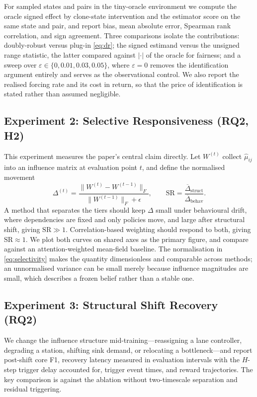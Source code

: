 \documentclass[conference]{IEEEtran}
\begin{document}
For sampled states and pairs in the tiny-oracle environment we compute the oracle signed effect by clone-state intervention and the estimator score on the same state and pair, and report bias, mean absolute error, Spearman rank correlation, and sign agreement. Three comparisons isolate the contributions: doubly-robust versus plug-in \eqref{eq:dr}; the signed estimand versus the unsigned range statistic, the latter compared against $|{\cdot}|$ of the oracle for fairness; and a sweep over $\varepsilon\in\{0,0.01,0.03,0.05\}$, where $\varepsilon=0$ removes the identification argument entirely and serves as the observational control. We also report the realised forcing rate and its cost in return, so that the price of identification is stated rather than assumed negligible.

\subsection{Experiment 2: Selective Responsiveness (RQ2, H2)}

This experiment measures the paper's central claim directly. Let $W^{(t)}$ collect $\hat\mu_{ij}$ into an influence matrix at evaluation point $t$, and define the normalised movement
\begin{equation}
\Delta^{(t)}=\frac{\big\|W^{(t)}-W^{(t-1)}\big\|_{F}}{\big\|W^{(t-1)}\big\|_{F}+\epsilon},
\qquad
\mathrm{SR}=\frac{\overline{\Delta}_{\mathrm{struct}}}{\overline{\Delta}_{\mathrm{behav}}} .
\label{eq:selectivity}
\end{equation}
A method that separates the tiers should keep $\Delta$ small under behavioural drift, where dependencies are fixed and only policies move, and large after structural shift, giving $\mathrm{SR}\gg1$. Correlation-based weighting should respond to both, giving $\mathrm{SR}\approx1$. We plot both curves on shared axes as the primary figure, and compare against an attention-weighted mean-field baseline. The normalisation in \eqref{eq:selectivity} makes the quantity dimensionless and comparable across methods; an unnormalised variance can be small merely because influence magnitudes are small, which describes a frozen belief rather than a stable one.

\subsection{Experiment 3: Structural Shift Recovery (RQ2)}

We change the influence structure mid-training---reassigning a lane controller, degrading a station, shifting sink demand, or relocating a bottleneck---and report post-shift core F1, recovery latency measured in evaluation intervals with the $H$-step trigger delay accounted for, trigger event times, and reward trajectories. The key comparison is against the ablation without two-timescale separation and residual triggering.
\end{document}

